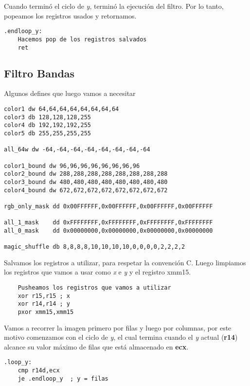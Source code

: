 \documentclass[a4paper]{article}
\begin{document}
\indent Cuando termin\'o el ciclo de \emph{y}, termin\'o la ejecuci\'on del filtro. Por lo tanto, popeamos los registros usados y retornamos.
 \begin{codesnippet}
\begin{verbatim}
.endloop_y:
    Hacemos pop de los registros salvados
    ret
\end{verbatim}
\end{codesnippet}

\newpage
\subsection{Filtro Bandas}

\indent Algunos defines que luego vamos a necesitar
\begin{codesnippet}
\begin{verbatim}
color1 dw 64,64,64,64,64,64,64,64
color3 db 128,128,128,255
color4 db 192,192,192,255
color5 db 255,255,255,255

all_64w dw -64,-64,-64,-64,-64,-64,-64,-64

color1_bound dw 96,96,96,96,96,96,96,96
color2_bound dw 288,288,288,288,288,288,288,288
color3_bound dw 480,480,480,480,480,480,480,480
color4_bound dw 672,672,672,672,672,672,672,672

rgb_only_mask dd 0x00FFFFFF,0x00FFFFFF,0x00FFFFFF,0x00FFFFFF

all_1_mask    dd 0xFFFFFFFF,0xFFFFFFFF,0xFFFFFFFF,0xFFFFFFFF
all_0_mask    dd 0x00000000,0x00000000,0x00000000,0x00000000

magic_shuffle db 8,8,8,8,10,10,10,10,0,0,0,0,2,2,2,2
\end{verbatim}
\end{codesnippet}
 
\indent Salvamos los registros a utilizar, para respetar la convenci\'on C. Luego limpiamos los registros que vamos a usar como \emph{x} e \emph{y} y el registro xmm15.
\begin{codesnippet}
\begin{verbatim}
    Pusheamos los registros que vamos a utilizar
    xor r15,r15 ; x
    xor r14,r14 ; y
    pxor xmm15,xmm15
\end{verbatim}
\end{codesnippet}

\indent Vamos a recorrer la imagen primero por filas y luego por columnas, por este motivo comenzamos con el ciclo de \emph{y}, el cual termina cuando el \emph{y} actual (\textbf{r14}) alcance su valor m\'aximo de filas que est\'a almacenado en \textbf{ecx}.
\begin{codesnippet}
\begin{verbatim}
.loop_y:
    cmp r14d,ecx
    je .endloop_y  ; y = filas
\end{verbatim}
\end{codesnippet}
\end{document}
